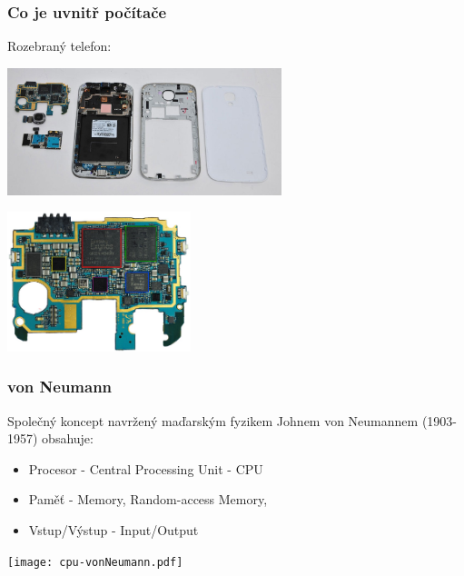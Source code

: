 \documentclass{beamer}
\begin{document}
\begin{frame}
\frametitle{Co je uvnitř počítače}

Rozebraný telefon:
\begin{center}
   \includegraphics[width=0.6\textwidth]{fig/mobile.jpg}
\end{center}
\begin{center}
   \includegraphics[width=0.4\textwidth]{fig/mobile-cpu.jpg}
\end{center}
\end{frame}


\begin{frame}
\frametitle{von Neumann}

Společný koncept navržený maďarským fyzikem Johnem von Neumannem (1903-1957) obsahuje:
\begin{itemize}
\item Procesor - Central Processing Unit - CPU
\item Paměť - Memory, Random-access Memory, 
\item Vstup/Výstup - Input/Output
\end{itemize}
\begin{center}
   \texttt{[image: cpu-vonNeumann.pdf]}
\end{center}

\end{frame}
\end{document}
